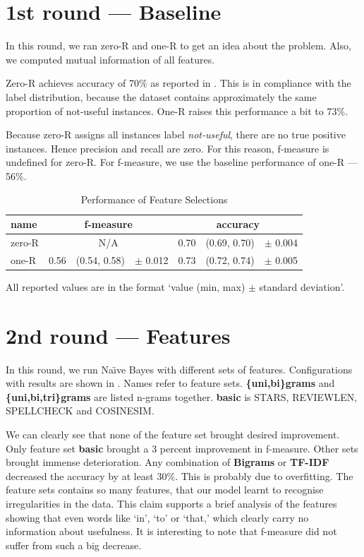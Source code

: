 \section{1st round --- Baseline}

In this round, we ran zero-R and one-R to get an idea about the problem.
Also, we computed mutual information of all features.

Zero-R achieves accuracy of 70\% as reported in .
This is in compliance with the label distribution,
because the dataset contains approximately the same proportion of not-useful instances.
One-R raises this performance a bit to 73\%.

Because zero-R assigns all instances label \textit{not-useful},
there are no true positive instances.
Hence precision and recall are zero.
For this reason, f-measure is undefined for zero-R.
For f-measure, we use the baseline performance of one-R --- 56\%.

\begin{table}[h!]

\centering
\begin{tabular}{lr@{~}r@{~}rr@{~}r@{~}r}
\toprule
\textbf{name}	& \multicolumn{3}{c}{\textbf{f-measure}} & \multicolumn{3}{c}{\textbf{accuracy}} \\
\midrule
zero-R & \multicolumn{3}{c}{N/A} & 0.70 & (0.69, 0.70) & $\pm$ 0.004 \\
one-R & 0.56 & (0.54, 0.58) & $\pm$ 0.012 & 0.73 & (0.72, 0.74) & $\pm$ 0.005 \\

\bottomrule
\end{tabular}

\caption{Performance of Feature Selections}\label{tab:base_perf}
All reported values are in the format `value (min, max) $\pm$ standard deviation'.
\end{table}

\section{2nd round --- Features}

In this round, we run Na\"{\i}ve Bayes with different sets of features.
Configurations with results are shown in .
Names refer to feature sets.
\textbf{\{uni,bi\}grams} and \textbf{\{uni,bi,tri\}grams} are listed n-grams together.
\textbf{basic} is STARS, REVIEWLEN, SPELLCHECK and COSINESIM.

We can clearly see that none of the feature set brought desired improvement.
Only feature set \textbf{basic} brought a 3 percent improvement in f-measure.
Other sets brought immense deterioration.
Any combination of \textbf{Bigrams} or \textbf{TF-IDF} decreased the accuracy by at least 30\%.
This is probably due to overfitting.
The feature sets contains so many features, that our model learnt to recognise
irregularities in the data.
This claim supports a brief analysis of the features showing that
even words like `in', `to' or `that,' which clearly carry no information about usefulness.
It is interesting to note that f-measure did not suffer from such a big decrease.



